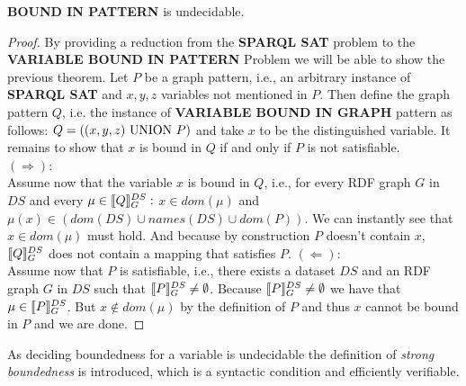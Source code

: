 \begin{theorem}
	\textbf{BOUND IN PATTERN} is undecidable.
\end{theorem}
\begin{proof}
By providing a reduction from the \textbf{SPARQL SAT} problem to the
\textbf{VARIABLE BOUND IN PATTERN} Problem we will be able to show the previous theorem.
Let $P$ be a graph pattern, i.e., an arbitrary instance of \textbf{SPARQL SAT} and
$x,y,z$ variables not mentioned in $P$. Then define the graph pattern $Q$,
i.e. the instance of \textbf{VARIABLE BOUND IN GRAPH} pattern as follows: $Q =
((x,y,z) \mbox{ UNION }  P)$ and take $x$ to be the distinguished variable.
It remains to show that $x$ is bound in $Q$  if and only if $P$ is not
satisfiable.\\
$(\Rightarrow)$:\\
Assume now that the variable $x$ is bound in $Q$, i.e., for every RDF graph $G$
in $DS$ and every $\mu \in \llbracket Q \rrbracket^{DS}_G:$ $x \in dom(\mu)$ and $\mu(x) \in
(dom(DS) \cup names(DS) \cup dom(P))$. We can instantly see that $x \in
dom(\mu)$ must hold. And because by construction $P$ doesn't contain $x$, $\llbracket Q
\rrbracket^{DS}_G$ does not contain a mapping that satisfies $P$.
\noindent$(\Leftarrow)$:\\
Assume now that $P$ is satisfiable, i.e., there exists a dataset $DS$ and an RDF
graph $G$ in $DS$ such that $\llbracket P \rrbracket^{DS}_G \neq \emptyset$. Because 
$\llbracket P \rrbracket^{DS}_G \neq \emptyset$ we have that $\mu \in \llbracket P \rrbracket^{DS}_G$. But
$x \notin dom(\mu)$ by the definition of $P$ and thus $x$ cannot be bound in
$P$ and we are done.
\end{proof} 

As deciding boundedness for a variable is undecidable the definition of
\emph{strong boundedness} is introduced, which is a syntactic condition and
efficiently verifiable. 

